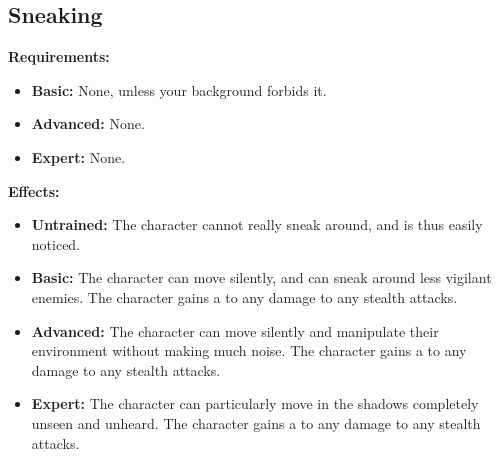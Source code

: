 \subsection{Sneaking}
\begin{table}[!ht]
\centering
{}
\end{table}
\textbf{Requirements:}
\begin{itemize}
	\item \textbf{Basic:} None, unless your background forbids it.
	\item \textbf{Advanced:} None.
	\item \textbf{Expert:} None.
\end{itemize}
\textbf{Effects:}
\begin{itemize}
	\item \textbf{Untrained:} The character cannot really sneak around, and is thus easily noticed.
	\item \textbf{Basic:} The character can move silently, and can sneak around less vigilant enemies. The character gains a  to any damage to any stealth attacks.
	\item \textbf{Advanced:} The character can move silently and manipulate their environment without making much noise. The character gains a  to any damage to any stealth attacks.
	\item \textbf{Expert:} The character can particularly move in the shadows completely unseen and unheard. The character gains a  to any damage to any stealth attacks.
\end{itemize}\newpage
